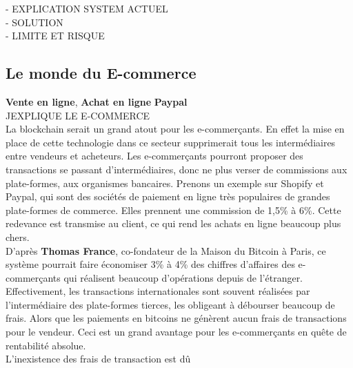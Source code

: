 \documentclass[12pt]{report}
\begin{document}
- EXPLICATION SYSTEM ACTUEL\\
- SOLUTION\\
- LIMITE ET RISQUE\\

    \subsection{Le monde du E-commerce}
\textbf{Vente en ligne}, \textbf{Achat en ligne} \textbf{Paypal}\\
\hspace{1cm} JEXPLIQUE  LE E-COMMERCE\\

\hspace{1cm} La blockchain serait un grand atout pour les e-commerçants. En effet la mise en place de cette technologie dans ce secteur supprimerait tous les intermédiaires entre vendeurs et acheteurs. Les e-commerçants pourront proposer des transactions se passant d'intermédiaires, donc ne plus verser de commissions aux plate-formes, aux organismes bancaires. Prenons un exemple sur Shopify et Paypal, qui sont des sociétés de paiement en ligne très populaires de grandes plate-formes de commerce. Elles prennent une commission de 1,5\% à 6\%. Cette redevance est transmise au client, ce qui rend les achats en ligne beaucoup plus chers.\\

\hspace{1cm} D'après \textbf{Thomas France}, co-fondateur de la Maison du Bitcoin à Paris, ce système pourrait faire économiser 3\% à 4\% des chiffres d'affaires des e-commerçants qui réalisent beaucoup d'opérations depuis de l'étranger. Effectivement, les transactions internationales sont souvent réalisées par l'intermédiaire des plate-formes tierces, les obligeant à débourser beaucoup de frais. Alors que les paiements en bitcoins ne génèrent aucun frais de transactions pour le vendeur. Ceci est un grand avantage pour les e-commerçants en quête de rentabilité absolue.\\

\hspace{1cm} L'inexistence des frais de transaction est dû 
\end{document}
